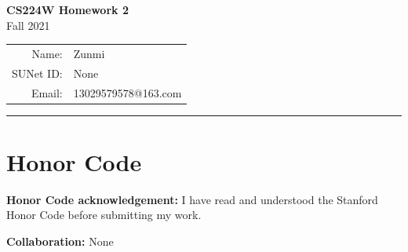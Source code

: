 \documentclass[11pt]{article}
\makeatletter
\newcommand{\studentname}{Zunmi}
\newcommand{\studentid}{None}
\newcommand{\studentemail}{13029579578@163.com}
\newcommand{\collaborators}{None}
\makeatother
\begin{document}
\begin{center}
  {\Large\bfseries CS224W Homework 2}\\[0.5em]
  {\large Fall 2021}\\[1em]
  \begin{tabular}{rl}
    Name: & \studentname \\
    SUNet ID: & \studentid \\
    Email: & \studentemail
  \end{tabular}
\end{center}

\vspace{0.75em}
\hrule
\vspace{1em}





\clearpage
\section*{Honor Code}

\noindent
\textbf{Honor Code acknowledgement:}
I have read and understood the Stanford Honor Code before submitting my work.

\noindent
\textbf{Collaboration:} \collaborators
\end{document}
